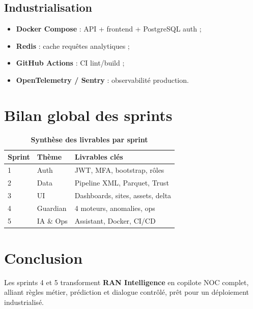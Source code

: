 \documentclass[12pt,a4paper]{report}
\begin{document}
\subsection{Industrialisation}
\begin{itemize}[leftmargin=*,itemsep=2pt]
    \item \textbf{Docker Compose} : API + frontend + PostgreSQL auth ;
    \item \textbf{Redis} : cache requêtes analytiques ;
    \item \textbf{GitHub Actions} : CI lint/build ;
    \item \textbf{OpenTelemetry / Sentry} : observabilité production.
\end{itemize}

\section{Bilan global des sprints}\label{sec:ch6-bilan}
\begin{table}[H]\centering\caption{\textbf{Synthèse des livrables par sprint}}\label{tab:sprint-synthese}
\begin{tabular}{|p{2cm}|p{5.5cm}|p{6.8cm}|}
\hline\rowcolor[RGB]{220,0,0}\color{white}\textbf{Sprint}&\color{white}\textbf{Thème}&\color{white}\textbf{Livrables clés}\\\hline
1 & Auth & JWT, MFA, bootstrap, rôles \\\hline
2 & Data & Pipeline XML, Parquet, Trust \\\hline
3 & UI & Dashboards, sites, assets, delta \\\hline
4 & Guardian & 4 moteurs, anomalies, ops \\\hline
5 & IA \& Ops & Assistant, Docker, CI/CD \\\hline
\end{tabular}
\end{table}

\section*{Conclusion}\label{sec:ch6-conclusion}
Les sprints 4 et 5 transforment \textbf{RAN Intelligence} en copilote NOC complet, alliant règles métier, prédiction et dialogue contrôlé, prêt pour un déploiement industrialisé.

\clearpage
\end{document}
